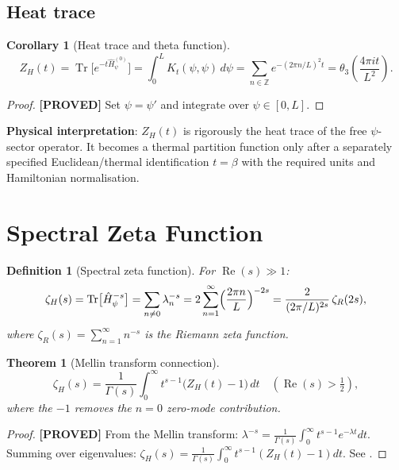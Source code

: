 \documentclass[11pt,a4paper]{article}
\newtheorem{theorem}{Theorem}
\newtheorem{corollary}{Corollary}
\newtheorem{definition}{Definition}
\newcommand{\proved}[1]{\textbf{[PROVED]} #1}
\begin{document}
\subsection{Heat trace}

\begin{corollary}[Heat trace and theta function]
  \label{cor:trace}
  \[
    Z_H(t) = \operatorname{Tr}\bigl[e^{-t\hat{H}_\psi^{(0)}}\bigr]
    = \int_0^L K_t(\psi,\psi)\, d\psi
    = \sum_{n\in\mathbb{Z}} e^{-(2\pi n/L)^2 t}
    = \theta_3\!\left(\frac{4\pi i t}{L^2}\right).
  \]
\end{corollary}

\begin{proof}
  \proved{} Set $\psi = \psi'$ and integrate over $\psi \in [0,L]$.
\end{proof}

\textbf{Physical interpretation}: $Z_H(t)$ is rigorously the heat trace of the free $\psi$-sector operator. It becomes a thermal partition function only after a separately specified Euclidean/thermal identification $t=\beta$ with the required units and Hamiltonian normalisation.

\section{Spectral Zeta Function}

\begin{definition}[Spectral zeta function]
  For $\operatorname{Re}(s) \gg 1$:
  \[
    \zeta_H(s) = \operatorname{Tr}\bigl[\hat{H}_\psi^{-s}\bigr]
    = \sum_{n\neq 0} \lambda_n^{-s}
    = 2\sum_{n=1}^\infty \Bigl(\frac{2\pi n}{L}\Bigr)^{-2s}
    = \frac{2}{(2\pi/L)^{2s}}\,\zeta_R(2s),
  \]
  where $\zeta_R(s) = \sum_{n=1}^\infty n^{-s}$ is the Riemann zeta function.
\end{definition}

\begin{theorem}[Mellin transform connection]
  \label{thm:mellin}
  \[
    \zeta_H(s) = \frac{1}{\Gamma(s)}\int_0^\infty t^{s-1}
    \bigl(Z_H(t) - 1\bigr)\, dt
    \quad (\operatorname{Re}(s) > \tfrac12),
  \]
  where the $-1$ removes the $n = 0$ zero-mode contribution.
\end{theorem}

\begin{proof}
  \proved{} From the Mellin transform:
  $\lambda^{-s} = \frac{1}{\Gamma(s)}\int_0^\infty t^{s-1}e^{-\lambda t}dt$.
  Summing over eigenvalues:
  $\zeta_H(s) = \frac{1}{\Gamma(s)}\int_0^\infty t^{s-1}(Z_H(t)-1)dt$.
  See \cite[Ch.\ 12]{Berger}.
\end{proof}
\end{document}
